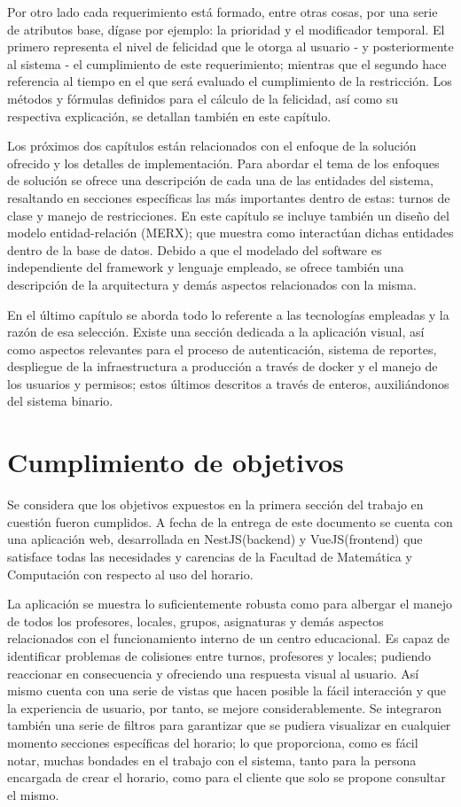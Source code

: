 Por otro lado cada requerimiento está formado, entre otras cosas, por una serie de atributos base, dígase por ejemplo: la prioridad y el modificador temporal. El primero representa el nivel de felicidad que  le otorga al usuario - y posteriormente al sistema - el cumplimiento de este requerimiento; mientras que el segundo hace referencia al tiempo en el que será evaluado el cumplimiento de la restricción. Los métodos y fórmulas definidos para el cálculo de la felicidad, así como su respectiva explicación, se detallan también en este capítulo.

Los próximos dos capítulos están relacionados con el enfoque de la solución ofrecido y los detalles de implementación. Para abordar el tema de los enfoques de solución se ofrece una descripción de cada una de las entidades del sistema, resaltando en secciones específicas las más importantes dentro de estas: turnos de clase y manejo de restricciones. En este capítulo se incluye también un diseño del modelo entidad-relación (MERX); que muestra como interactúan dichas entidades dentro de la base de datos. Debido a que el modelado del software es independiente del framework y lenguaje empleado, se ofrece también una descripción de la arquitectura y demás aspectos relacionados con la misma. 

En el último capítulo se aborda todo lo referente a las tecnologías empleadas y la razón de esa selección. Existe una sección dedicada a la aplicación visual, así como aspectos relevantes para el proceso de autenticación, sistema de reportes, despliegue de la infraestructura a producción a través de docker y el manejo de los usuarios y permisos; estos últimos descritos a través de enteros, auxiliándonos del sistema binario. 

\section{Cumplimiento de objetivos}

Se considera que los objetivos expuestos en la primera sección del trabajo en cuestión fueron cumplidos. A fecha de la entrega de este documento se cuenta con una aplicación web, desarrollada en NestJS(backend) y VueJS(frontend) que satisface todas las necesidades y carencias de la Facultad de Matemática y Computación con respecto al uso del horario. 

La aplicación se muestra lo suficientemente robusta como para albergar el manejo de todos los profesores, locales, grupos, asignaturas y demás aspectos relacionados con el funcionamiento interno de un centro educacional. Es capaz de identificar problemas de colisiones entre turnos, profesores y locales; pudiendo reaccionar en consecuencia y ofreciendo una respuesta visual al usuario. Así mismo cuenta con una serie de vistas que hacen posible la fácil interacción y que la experiencia de usuario, por tanto, se mejore considerablemente. Se integraron también una serie de filtros para garantizar que se pudiera visualizar en cualquier momento secciones específicas del horario; lo que proporciona, como es fácil notar, muchas bondades en el trabajo con el sistema, tanto para la persona encargada de crear el horario, como para el cliente que solo se propone consultar el mismo. 

